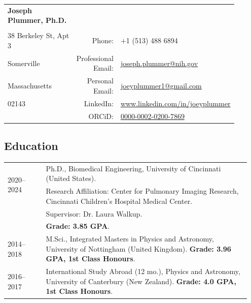 \documentclass[12pt,]{scrartcl}
\date{}
\begin{document}
\begin{table}[h]
{\def\arraystretch{1.2}\tabcolsep=0pt
\begin{tabular}{p{0.50\linewidth}p{0.05\linewidth}p{0.35\linewidth}}

  \multirow{1}{*}{\LARGE \textbf{Joseph Plummer, Ph.D.}} &  &  \\
  
  & & \\
  
  38 Berkeley St, Apt 3 & \multicolumn{1}{r}{Phone:\;\;} & \multicolumn{1}{l}{$+$1 (513) 488 6894} \\
  
   Somerville & \multicolumn{1}{r}{Professional Email:\;\;} &\multicolumn{1}{l}{\href{joseph.plummer@nih.gov}{joseph.plummer@nih.gov}} \\
  
   Massachusetts & \multicolumn{1}{r}{Personal Email:\;\;} &\multicolumn{1}{l}{\href{joeyplummer1@gmail.com}{joeyplummer1@gmail.com}} \\
  
   02143 & \multicolumn{1}{r}{LinkedIn:\;\;} & \multicolumn{1}{l}{\url{www.linkedin.com/in/joeyplummer}} \\
  
  & \multicolumn{1}{r}{ORCiD:\;\;} & \multicolumn{1}{l}{\href{https://orcid.org/0000-0002-0200-7869}{0000-0002-0200-7869}} 

\end{tabular}%
}
\end{table}
\subsection{Education}\label{education}


\begin{table}[h]
{\def\arraystretch{1.5}\tabcolsep=0pt
\begin{tabular}{p{0.15\linewidth}p{0.8\linewidth}}

  \multirow{2}{*}[0.85em]{2020--2024} & Ph.D., Biomedical Engineering, University of Cincinnati (United States). \\
  
  & Research Affiliation: Center for Pulmonary Imaging Research, Cincinnati Children's Hospital Medical Center. \\
  & Supervisor: Dr. Laura Walkup. \\ & \textbf{Grade: 3.85 GPA}.\\
  
  2014--2018 & M.Sci., Integrated Masters in Physics and Astronomy, University of Nottingham (United Kingdom). \textbf{Grade: 3.96 GPA, 1st Class Honours}. \\

  2016--2017 & International Study Abroad (12 mo.), Physics and Astronomy, University of Canterbury (New Zealand). \textbf{Grade: 4.0 GPA, 1st Class Honours}. 
\end{tabular}%
}
\end{table}
\end{document}
